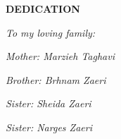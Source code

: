 \newpage


\begin{center}
\textbf{DEDICATION}
\end{center}
\begin{dedication}
\begin{center}
\textit{To my loving family:}
\end{center}
\begin{center}
	\textit{Mother: Marzieh Taghavi}
\end{center}

\begin{center}
	\textit{Brother: Brhnam Zaeri}
\end{center}

\begin{center}
	\textit{Sister: Sheida Zaeri}
\end{center}

\begin{center}
	\textit{Sister: Narges Zaeri}
\end{center}
\end{dedication}